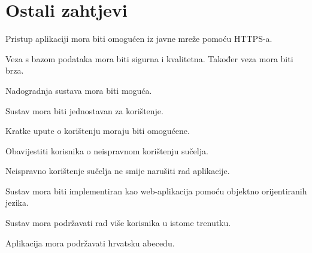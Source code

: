 		\section{Ostali zahtjevi}
			 
			 \begin{packed_item}
			 	
			 	\item Pristup aplikaciji mora biti omogućen iz javne mreže pomoću HTTPS-a.
			 	\item Veza s bazom podataka mora biti sigurna i kvalitetna. Također veza mora biti brza.
			 	\item Nadogradnja sustava mora biti moguća.
			 	\item Sustav mora biti jednostavan za korištenje.
			 	\item Kratke upute o korištenju moraju biti omogućene.
			 	\item Obavijestiti korisnika o neispravnom korištenju sučelja.
			 	\item Neispravno korištenje sučelja ne smije narušiti rad aplikacije.
			 	\item Sustav mora biti implementiran kao web-aplikacija pomoću objektno orijentiranih jezika.
			 	\item Sustav mora podržavati rad više korisnika u istome trenutku.
			 	\item Aplikacija mora podržavati hrvatsku abecedu.
			 	
			 \end{packed_item}
			 
			 
	